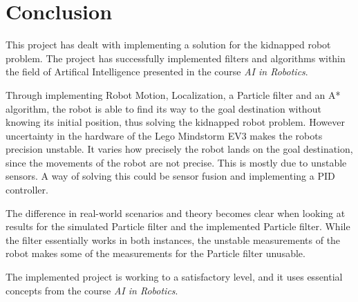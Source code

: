 \chapter{Conclusion}
\label{chp:conc}

This project has dealt with implementing a solution for the kidnapped robot problem. The project has successfully implemented filters and algorithms within the field of Artifical Intelligence presented in the course \emph{AI in Robotics}.

Through implementing Robot Motion, Localization, a Particle filter and an A* algorithm, the robot is able to find its way to the goal destination without knowing its initial position, thus solving the kidnapped robot problem. However uncertainty in the hardware of the Lego Mindstorm EV3 makes the robots precision unstable. It varies how precisely the robot lands on the goal destination, since the movements of the robot are not precise. This is mostly due to unstable sensors. A way of solving this could be sensor fusion and implementing a PID controller.

The difference in real-world scenarios and theory becomes clear when looking at  results for the simulated Particle filter and the implemented Particle filter. While the filter essentially works in both instances, the unstable measurements of the robot makes some of the measurements for the Particle filter unusable.

The implemented project is working to a satisfactory level, and it uses essential concepts from the course \emph{AI in Robotics}.
 